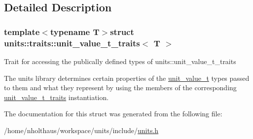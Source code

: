 \subsection{Detailed Description}
\subsubsection*{template$<$typename T$>$struct units\+::traits\+::unit\+\_\+value\+\_\+t\+\_\+traits$<$ T $>$}

Trait for accessing the publically defined types of {\ttfamily units\+::unit\+\_\+value\+\_\+t\+\_\+traits} 

The units library determines certain properties of the {\ttfamily \hyperlink{structunits_1_1unit__value__t}{unit\+\_\+value\+\_\+t}} types passed to them and what they represent by using the members of the corresponding {\ttfamily \hyperlink{structunits_1_1traits_1_1unit__value__t__traits}{unit\+\_\+value\+\_\+t\+\_\+traits}} instantiation. 

The documentation for this struct was generated from the following file\+:\begin{DoxyCompactItemize}
\item 
/home/nholthaus/workspace/units/include/\hyperlink{units_8h}{units.\+h}\end{DoxyCompactItemize}
